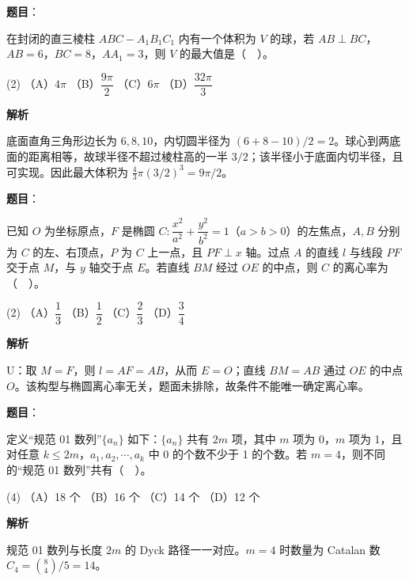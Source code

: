 \begin{answer}

\textbf{题目}：

在封闭的直三棱柱 \(ABC-A_1B_1C_1\) 内有一个体积为 \(V\) 的球，若 \(AB\perp BC\)，\(AB=6\)，\(BC=8\)，\(AA_1=3\)，则 \(V\) 的最大值是（　）。

\begin{gkopts}(2)
\task （A）\(4\pi\)
\task （B）\(\dfrac{9\pi}{2}\)
\task （C）\(6\pi\)
\task （D）\(\dfrac{32\pi}{3}\)
\end{gkopts}

\textbf{解析}

底面直角三角形边长为 \(6,8,10\)，内切圆半径为 \((6+8-10)/2=2\)。球心到两底面的距离相等，故球半径不超过棱柱高的一半 \(3/2\)；该半径小于底面内切半径，且可实现。因此最大体积为 \(\frac43\pi(3/2)^3=9\pi/2\)。


\end{answer}
\begin{answer}

\textbf{题目}：

已知 \(O\) 为坐标原点，\(F\) 是椭圆 \(C:\dfrac{x^2}{a^2}+\dfrac{y^2}{b^2}=1\)（\(a>b>0\)）的左焦点，\(A,B\) 分别为 \(C\) 的左、右顶点，\(P\) 为 \(C\) 上一点，且 \(PF\perp x\) 轴。过点 \(A\) 的直线 \(l\) 与线段 \(PF\) 交于点 \(M\)，与 \(y\) 轴交于点 \(E\)。若直线 \(BM\) 经过 \(OE\) 的中点，则 \(C\) 的离心率为（　）。

\begin{gkopts}(2)
\task （A）\(\dfrac13\)
\task （B）\(\dfrac12\)
\task （C）\(\dfrac23\)
\task （D）\(\dfrac34\)
\end{gkopts}

\textbf{解析}

U：取 \(M=F\)，则 \(l=AF=AB\)，从而 \(E=O\)；直线 \(BM=AB\) 通过 \(OE\) 的中点 \(O\)。该构型与椭圆离心率无关，题面未排除，故条件不能唯一确定离心率。


\end{answer}
\begin{answer}

\textbf{题目}：

定义“规范 01 数列”\(\{a_n\}\) 如下：\(\{a_n\}\) 共有 \(2m\) 项，其中 \(m\) 项为 0，\(m\) 项为 1，且对任意 \(k\leq 2m\)，\(a_1,a_2,\cdots,a_k\) 中 0 的个数不少于 1 的个数。若 \(m=4\)，则不同的“规范 01 数列”共有（　）。

\begin{gkopts}(4)
\task （A）18 个
\task （B）16 个
\task （C）14 个
\task （D）12 个
\end{gkopts}

\textbf{解析}

规范 01 数列与长度 \(2m\) 的 Dyck 路径一一对应。\(m=4\) 时数量为 Catalan 数 \(C_4=\binom84/5=14\)。


\end{answer}

